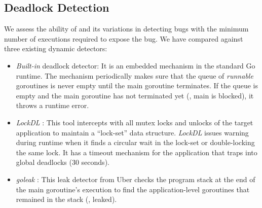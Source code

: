 %

\subsection{Deadlock Detection}
\label{sec:dl_evaluation}
We assess the ability of \goat and its variations in detecting bugs with the minimum number of executions required to expose the bug.
%
We have compared \goat against three existing dynamic detectors:
\begin{itemize}
  \item \textit{Built-in} deadlock detector: It is an embedded mechanism in the standard Go runtime. The mechanism periodically makes sure that the queue of \textit{runnable} goroutines is never empty until the main goroutine terminates. If the queue is empty and the main goroutine has not terminated yet (\ie, main is blocked), it throws a runtime error.
  \item \textit{LockDL} \cite{lockdl}: This tool intercepts with all mutex locks and unlocks of the target application to maintain a ``lock-set'' data structure. \textit{LockDL} issues warning during runtime when it finds a circular wait in the lock-set or double-locking the same lock. It has a timeout mechanism for the application that traps into global deadlocks (30 seconds).
  \item \textit{goleak} \cite{goleak}: This leak detector from Uber checks the program stack at the end of the main goroutine's execution to find the application-level goroutines that remained in the stack (\ie, leaked).
\end{itemize}

